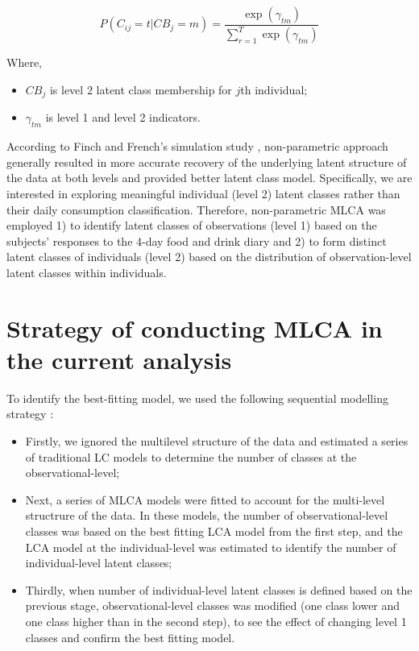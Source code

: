 \begin{equation}
P(C_{ij} = t | CB_j = m)  = \frac{\exp(\gamma_{tm})}{\sum_{r=1}^{T}\exp(\gamma_{tm})}
\end{equation}

Where, 

\begin{itemize}
	\item $CB_j$ is level 2 latent class membership for $j$th individual;
	\item $\gamma_{tm}$ is level 1 and level 2 indicators. 
\end{itemize}

According to Finch and French's simulation study \parencite{finch2014multilevel}, non-parametric approach generally resulted in more accurate recovery of the underlying latent structure of the data at both levels and provided better latent class model. Specifically, we are interested in exploring meaningful individual (level 2) latent classes rather than their daily consumption classification. Therefore, non-parametric MLCA was employed 1) to identify latent classes of observations (level 1) based on the subjects' responses to the 4-day food and drink diary and 2) to form distinct latent classes of individuals (level 2) based on the distribution of observation-level latent classes within individuals.\vspace{-0.3cm}
 

\section{Strategy of conducting MLCA in the current analysis}\vspace{-0.3cm}

To identify the best-fitting model, we used the following sequential modelling strategy \parencite{henry2010multilevel}: 

\begin{itemize}
	\item Firstly, we ignored the multilevel structure of the data and estimated a series of traditional LC models to determine the number of classes at the observational-level;
	\item Next, a series of MLCA models were fitted to account for the multi-level structrure of the data. In these models, the number of observational-level classes was based on the best fitting LCA model from the first step, and the LCA model at the individual-level was estimated to identify the number of individual-level latent classes;
	\item Thirdly, when number of individual-level latent classes is defined based on the previous stage, observational-level classes was modified (one class lower and one class higher than in the second step), to see the effect of changing level 1 classes and confirm the best fitting model.
\end{itemize}

